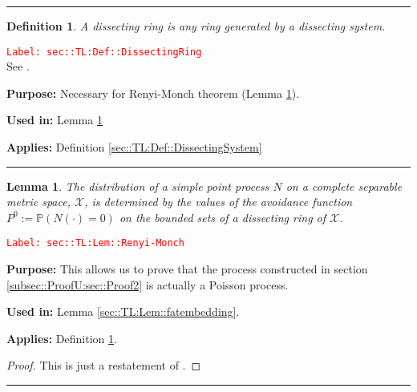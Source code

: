 \documentclass[12pt]{article}
\newcommand{\mb}{\mathbb}
\newcommand{\mc}{\mathcal}
\newcommand{\tr}{\textcolor{red}}
\newcommand{\labe}[1]{\tr{\texttt{Label: #1}}}
\newcommand{\purpose}{\textbf{Purpose: }}
\newcommand{\usein}{\textbf{Used in: }}
\newcommand{\app}{\textbf{Applies: }}
\newcommand{\lin}{\rule{\linewidth}{0.4 pt}}
\newcommand{\pr}{\mb{P}}							%
\newcommand{\defeq}{:=}								%
\newcommand{\poiss}{N}							%
\newcommand{\gid}[1]{^{#1}}						%
\newcommand{\spce}{\mc{X}}						%
\newtheorem{lem}[thms]{Lemma}
\newtheorem{defn}[thms]{Definition}
\begin{document}
\lin

\begin{defn}
A dissecting ring is any ring generated by a dissecting system.
\label{sec::TL:Def::DissectingRing}
\end{defn}
\labe{sec::TL:Def::DissectingRing}\\

See \cite[Definition A2.1.V]{DalVer03}.

\purpose Necessary for Renyi-Monch theorem (Lemma \ref{sec::TL:Lem::Renyi-Monch}).

\usein Lemma \ref{sec::TL:Lem::Renyi-Monch}

\app Definition \ref{sec::TL:Def::DissectingSystem}

\lin

\begin{lem}
The distribution of a simple point process \(\poiss\) on a complete separable metric space, \(\spce\), is determined by the values of the avoidance function \(P\gid{0}\defeq \pr(\poiss(\cdot) = 0)\) on the bounded sets of a dissecting ring of \(\spce\).
\label{sec::TL:Lem::Renyi-Monch}
\end{lem}
\labe{sec::TL:Lem::Renyi-Monch}

\purpose This allows us to prove that the process constructed in section \ref{subsec::ProofU:sec::Proof2} is actually a Poisson process.

\usein Lemma \ref{sec::TL:Lem::fatembedding}.

\app Definition \ref{sec::TL:Def::DissectingRing}.

\begin{proof}
This is just a restatement of \cite[Theorem 9.2.XII]{DalVer08}.
\end{proof}
\lin
\end{document}
